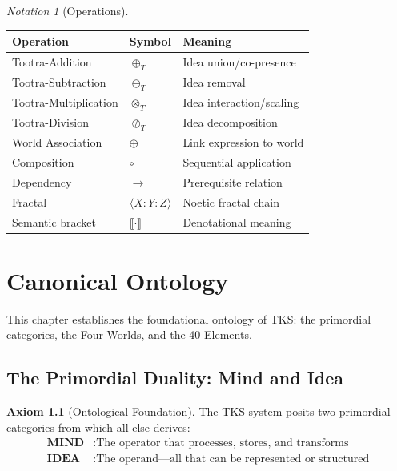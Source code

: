 \documentclass[11pt,twoside,openright]{book}
\theoremstyle{definition}
\newtheorem{axiom}[definition]{Axiom}
\theoremstyle{plain}
\theoremstyle{remark}
\newtheorem{notation}[definition]{Notation}
\newcommand{\sem}[1]{\llbracket #1 \rrbracket}
\newcommand{\Tadd}{\oplus_T}
\newcommand{\Tsub}{\ominus_T}
\newcommand{\Tmul}{\otimes_T}
\newcommand{\Tdiv}{\oslash_T}
\begin{document}
\begin{notation}[Operations]
\label{not:operations}
\begin{center}
\begin{tabular}{lll}
\toprule
\textbf{Operation} & \textbf{Symbol} & \textbf{Meaning} \\
\midrule
Tootra-Addition & $\Tadd$ & Idea union/co-presence \\
Tootra-Subtraction & $\Tsub$ & Idea removal \\
Tootra-Multiplication & $\Tmul$ & Idea interaction/scaling \\
Tootra-Division & $\Tdiv$ & Idea decomposition \\
World Association & $\oplus$ & Link expression to world \\
Composition & $\circ$ & Sequential application \\
Dependency & $\to$ & Prerequisite relation \\
Fractal & $\langle X : Y : Z \rangle$ & Noetic fractal chain \\
Semantic bracket & $\sem{\cdot}$ & Denotational meaning \\
\bottomrule
\end{tabular}
\end{center}
\end{notation}

\chapter{Canonical Ontology}
\label{ch:ontology}

This chapter establishes the foundational ontology of TKS: the primordial categories, the Four Worlds, and the 40 Elements.

\section{The Primordial Duality: Mind and Idea}

\begin{axiom}[Ontological Foundation]
\label{ax:ontological-foundation}
The TKS system posits two primordial categories from which all else derives:
\begin{align}
\textbf{MIND} &: \text{The operator that processes, stores, and transforms} \\
\textbf{IDEA} &: \text{The operand---all that can be represented or structured}
\end{align}
\end{axiom}
\end{document}

